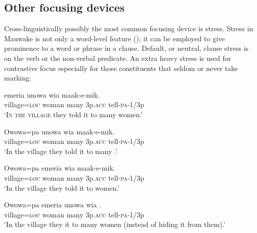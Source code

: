 \subsection{Other focusing devices}

Cross-linguistically possibly the most common focusing device is stress. Stress in Mauwake is not only a word-level feature (); it can be employed to give prominence to a word or phrase in a clause. Default, or neutral, clause stress is on the verb or the non-verbal predicate. An extra heavy stress is used for contrastive focus especially for those constituents that seldom or never take  marking:  

\ea%
\label{ex:9:x1739}
\gll {}\textstyleEmphasizedVernacularWords{{{\textprimstress}}}  emeria  unowa  wia  maak-e-mik. \\
village=\textsc{loc}  woman  many  3p.\textsc{acc}  tell-\textsc{pa}-1/3p      \\
\glt`\textsc{In the village} they told it to many women.'
\z


\ea%
\label{ex:9:x1740}
\gll Owowa=pa  \textstyleEmphasizedVernacularWords{{{\textprimstress}}}  unowa  wia  maak-e-mik. \\
village=\textsc{loc}  woman  many  3p.\textsc{acc}  tell-\textsc{pa}-1/3p      \\
\glt`In the village they told it to many .'
\z


\ea%
\label{ex:9:x1741}
\gll Owowa=pa  emeria  \textstyleEmphasizedVernacularWords{{{\textprimstress}}}  wia  maak-e-mik. \\
village=\textsc{loc}  woman  many  3p.\textsc{acc}  tell-\textsc{pa}-1/3p      \\
\glt`In the village they told it to  women.'
\z


\ea%
\label{ex:9:x1742}
\gll Owowa=pa  emeria  unowa  wia  \textstyleEmphasizedVernacularWords{{{\textprimstress}}}. \\
village=\textsc{loc}  woman  many  3p.\textsc{acc}  tell-\textsc{pa}-1/3p      \\
\glt`In the village they  it to many women (instead of hiding it from them).'
\z


